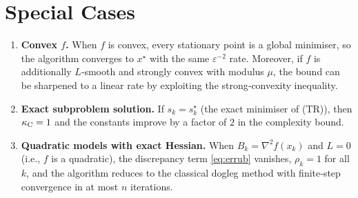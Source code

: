 \documentclass{article}
\begin{document}
\section*{Special Cases}
\begin{enumerate}[label=\alph*.]
\item \textbf{Convex $f$.} When $f$ is convex, every stationary point is a global minimiser, so the algorithm converges to $x^{\star}$ with the same $\varepsilon^{-2}$ rate.  Moreover, if $f$ is additionally $L$‑smooth and strongly convex with modulus $\mu$, the bound can be sharpened to a linear rate by exploiting the strong‑convexity inequality.
\item \textbf{Exact subproblem solution.} If $s_{k}=s_{k}^{\star}$ (the exact minimiser of (TR)), then $\kappa_{\rm C}=1$ and the constants improve by a factor of $2$ in the complexity bound.
\item \textbf{Quadratic models with exact Hessian.} When $B_{k}=\nabla^{2}f(x_{k})$ and $L=0$ (i.e., $f$ is a quadratic), the discrepancy term \eqref{eq:errub} vanishes, $\rho_{k}=1$ for all $k$, and the algorithm reduces to the classical dogleg method with finite‑step convergence in at most $n$ iterations.
\end{enumerate}
\end{document}
